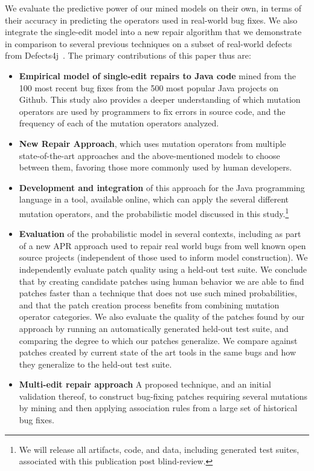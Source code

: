\documentclass[conference]{IEEEtran}
\begin{document}
We evaluate the predictive power of our mined models on their own, in terms of their
accuracy in predicting the operators used in real-world bug fixes.  We also
integrate the single-edit model into a new repair algorithm that we demonstrate
in comparison to several previous techniques on a subset of real-world defects from Defects4j~\cite{just14}. 
%
The primary contributions of this paper thus are:
\begin{itemize}
\item \textbf{Empirical model of single-edit repairs to Java code} mined
      from the 100 most recent bug fixes from the 500 most popular Java projects on
    Github. This study also provides a deeper
    understanding of which mutation operators are used by programmers to fix
    errors in source code, and the frequency of each of the mutation operators
    analyzed. 
	\item \textbf{New Repair Approach}, which uses mutation operators
    from multiple state-of-the-art approaches and
    the above-mentioned models to choose between them, favoring those more commonly
    used by human developers.
    \item \textbf{Development and integration} of this approach for the Java
      programming language in a tool, available online, which can apply the
      several different mutation operators, and the probabilistic model
      discussed in this study.\footnote{We will release all artifacts, code, and
        data, including generated test suites, associated with this publication post blind-review.} %
  \item \textbf{Evaluation} of the probabilistic model in several
    contexts, including as part of a new APR approach used to repair real world bugs from well
    known open source projects (independent of those used to inform model
    construction). We independently evaluate patch quality using a held-out test
    suite. We conclude that by creating candidate patches using human behavior
    we are able to find patches faster than a technique that does not use such
    mined probabilities, and that the patch creation
    process benefits from combining mutation operator categories. We also evaluate the quality of the patches found by our approach by running an automatically generated held-out test suite, and comparing the degree to which our patches generalize. We compare against patches created by current state of the art tools in the same bugs and how they generalize to the held-out test suite.
  \item \textbf{Multi-edit repair approach} A proposed technique, and an initial
    validation thereof, to construct 
    bug-fixing patches requiring several mutations by mining and then applying association
    rules from a large set of historical bug fixes. 
\end{itemize}
\end{document}
